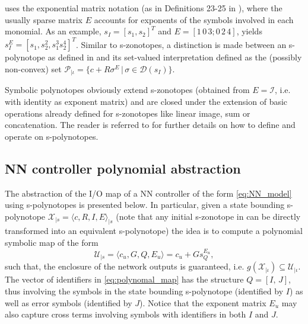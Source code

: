 \documentclass[journal]{IEEEtran}
\begin{document}
 uses the exponential matrix notation (as in Definitions 23-25 in \cite{combastel2020functional}), where the usually sparse matrix $E$ accounts for exponents of the symbols involved in each monomial. As an example, $s_I = [s_1, s_2]^T$ and $E = [1 \, 0 \, 3; 0 \, 2 \, 4]$, yields $s_I^E = [s_1, s_2^2, s_1^3s_2^4]^T$. Similar to s-zonotopes, a distinction is made between an s-polynotope  as defined in  and its set-valued interpretation  defined as the (possibly non-convex) set $\mathcal{P}_{|\iota} =  \{c+R\sigma^E \, | \, \sigma \in \mathcal{D}(s_I)\}$.

Symbolic polynotopes obviously extend  s-zonotopes (obtained from $E = \mathcal{I}$, i.e. with identity as exponent matrix) and are closed under the extension of basic operations already defined for s-zonotopes like linear image, sum or concatenation. The reader is referred to \cite{combastel2020functional} for further details on how to define and operate on s-polynotopes.


 \subsection{NN controller polynomial abstraction} \label{sec:polynotope_NN}
 
The abstraction of the I/O map of a NN controller of the form \eqref{eq:NN_model} using s-polynotopes is presented below. In particular, given a state bounding s-polynotope $\mathcal{X}_{|s} = \langle c,R,I,E\rangle_{|s}$ (note that any initial s-zonotope in  can be directly transformed into an equivalent s-polynotope) the idea is to compute a polynomial symbolic map of the form
\begin{equation}\label{eq:polynomal_map}
    \mathcal{U}_{|s} = \langle c_u, G, Q, E_u\rangle =  c_u + Gs_Q^{E_u},
\end{equation}
\noindent such that, the enclosure of the network outputs is guaranteed, i.e. $g(\mathcal{X}_{|\iota}) \subseteq \mathcal{U}_{|\iota}$. The vector of identifiers in \eqref{eq:polynomal_map} has the structure  $Q = [I, \, J]$, thus involving the symbols in the state bounding s-polynotope (identified by $I$) as well as error symbols (identified by $J$). Notice that the exponent matrix $E_u$ may also capture cross terms involving symbols with identifiers in both $I$ and $J$.
\end{document}
